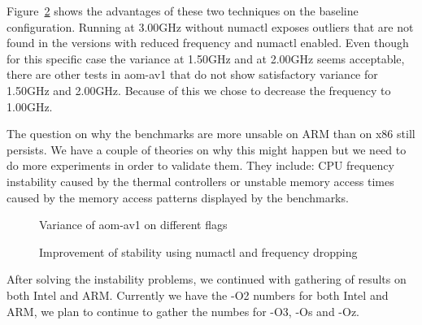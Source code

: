 Figure~\ref{fig:EncoderModeSpeed11RealtimeInputBosphorus4K} shows the advantages
of these two techniques on the baseline configuration. Running at 3.00GHz
without numactl exposes outliers that are not found in the versions with reduced
frequency and numactl enabled. Even though for this specific case the variance
at 1.50GHz and at 2.00GHz seems acceptable, there are other tests in aom-av1
that do not show satisfactory variance for 1.50GHz and 2.00GHz. Because of this
we chose to decrease the frequency to 1.00GHz.

The question on why the benchmarks are more unsable on ARM than on x86 still
persists. We have a couple of theories on why this might happen but we need to
do more experiments in order to validate them. They include: CPU frequency
instability caused by the thermal controllers or unstable memory access times
caused by the memory access patterns displayed by the benchmarks. 

\begin{figure}[]
  \centering
  
  \caption{Variance of aom-av1 on different flags}
  \label{fig:EncoderModeSpeed6TwoPassInputBosphorus4K}
\end{figure}

\begin{figure}[]
  \centering
  
  \caption{Improvement of stability using numactl and frequency dropping}
  \label{fig:EncoderModeSpeed11RealtimeInputBosphorus4K}
\end{figure}

After solving the instability problems, we continued with gathering of results
on both Intel and ARM. Currently we have the -O2 numbers for both Intel and ARM,
we plan to continue to gather the numbes for -O3, -Os and -Oz.
